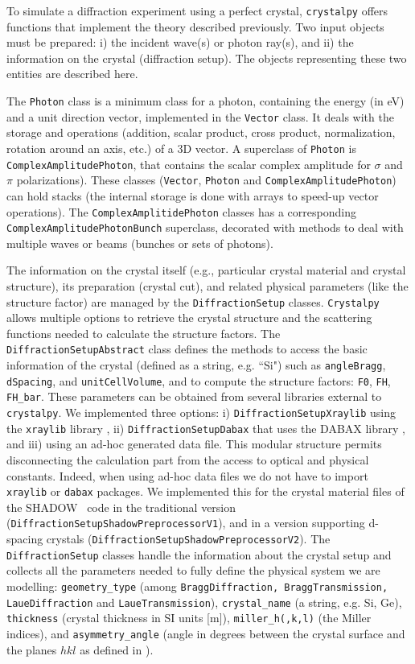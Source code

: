 \documentclass[preprint]{iucr}              %
\begin{document}
To simulate a diffraction experiment using a perfect crystal, {\tt crystalpy}  offers functions that implement the theory described previously. Two input objects must be prepared: i) the incident wave(s) or  photon ray(s), and ii) the information on the crystal (diffraction setup). The objects representing these two entities are described here. 

The {\tt Photon} class is a minimum class for a photon, containing the energy (in eV) and a unit direction vector, implemented in 
the {\tt Vector} class. It deals with the storage and operations (addition, scalar product, cross product, normalization, rotation around an axis, etc.) of a 3D vector. A superclass of {\tt Photon} is {\tt ComplexAmplitudePhoton}, that contains the scalar complex amplitude for $\sigma$ and $\pi$ polarizations). 
These classes ({\tt Vector}, {\tt Photon} and {\tt ComplexAmplitudePhoton}) can hold stacks (the internal storage is done with arrays to speed-up vector operations). The {\tt ComplexAmplitidePhoton} classes 
has a corresponding {\tt ComplexAmplitudePhotonBunch} superclass, decorated with methods to deal with multiple waves or beams (bunches or sets of photons). 

The information on the crystal itself (e.g., particular crystal material and crystal structure), its preparation (crystal cut), and related physical parameters (like the structure factor) are managed by the {\tt DiffractionSetup} classes. {\tt Crystalpy} allows multiple options to retrieve the crystal structure and the scattering functions needed to calculate the structure factors. 
The {\tt DiffractionSetupAbstract} class defines the methods to access the basic information of the crystal (defined as a string, e.g. ``Si") such as {\tt angleBragg}, {\tt dSpacing}, and {\tt unitCellVolume}, and to compute the structure factors: {\tt F0}, {\tt FH}, {\tt FH\_bar}. These parameters can be obtained from several libraries external to {\tt crystalpy}. We implemented three options: i) {\tt DiffractionSetupXraylib} using the {\tt xraylib} library \cite{xraylib}, ii) {\tt DiffractionSetupDabax} that uses the DABAX library \cite{dabax}, and iii) using an ad-hoc generated data file. This modular structure permits disconnecting the calculation part from the access to optical and physical constants. Indeed, when using ad-hoc data files we do not have to import {\tt xraylib} or {\tt dabax} packages. We implemented this for the crystal material files of the SHADOW~\cite{codeSHADOW} code in the traditional version ({\tt DiffractionSetupShadowPreprocessorV1}), and in
a version supporting 
d-spacing crystals ({\tt DiffractionSetupShadowPreprocessorV2}).
The {\tt DiffractionSetup} classes handle the information about the crystal setup and collects all the parameters needed to fully define the physical system we are modelling:
{\tt geometry\_type} (among {\tt BraggDiffraction, BraggTransmission, LaueDiffraction} and {\tt LaueTransmission}),
{\tt crystal\_name} (a string, e.g. Si, Ge),
{\tt thickness} (crystal thickness in SI units [m]),
{\tt miller\_h(,k,l)} (the Miller indices),
and {\tt asymmetry\_angle} (angle in degrees between the crystal surface and the planes $hkl$ as defined in \cite{codeCRYSTAL}).
\end{document}
